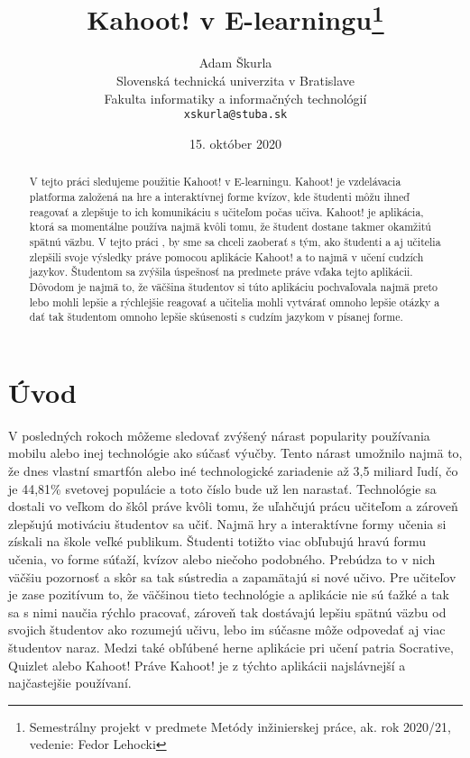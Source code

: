 \documentclass[10pt,oneside,slovak,a4paper]{article}
\title{Kahoot! v E-learningu\thanks{Semestrálny projekt v predmete Metódy inžinierskej práce, ak. rok 2020/21, vedenie: Fedor Lehocki}} %
\author{Adam Škurla\\[2pt]
	{\small Slovenská technická univerzita v Bratislave}\\
	{\small Fakulta informatiky a informačných technológií}\\
	{\small \texttt{xskurla@stuba.sk}}
	}
\date{\small 15. október 2020}
\begin{document}
\maketitle

\begin{abstract}
V tejto práci sledujeme použitie Kahoot! v E-learningu. Kahoot! je vzdelávacia platforma založená na hre a interaktívnej forme kvízov, kde študenti môžu ihneď reagovať a zlepšuje to ich komunikáciu s učiteľom počas učiva. Kahoot! je aplikácia, ktorá sa momentálne používa najmä kvôli tomu, že študent dostane takmer okamžitú spätnú väzbu. V tejto práci , by sme sa chceli zaoberať s tým, ako študenti a aj učitelia zlepšili svoje výsledky práve pomocou aplikácie Kahoot! a to najmä v učení cudzích jazykov. Študentom sa zvýšila úspešnosť na predmete práve vďaka tejto aplikácii. Dôvodom je najmä to, že väčšina študentov si túto aplikáciu pochvaľovala najmä preto lebo mohli lepšie a rýchlejšie reagovať a učitelia mohli vytvárať omnoho lepšie otázky a dať tak študentom omnoho lepšie skúsenosti s cudzím jazykom v písanej forme.
\end{abstract}



\section{Úvod}

V posledných rokoch môžeme sledovať zvýšený nárast popularity používania mobilu alebo inej technológie ako súčasť výučby. Tento nárast umožnilo najmä to, že dnes vlastní smartfón alebo iné technologické zariadenie až 3,5 miliard ľudí, čo je 44,81\% svetovej populácie a toto číslo bude už len narastať. Technológie sa dostali vo veľkom do škôl práve kvôli tomu, že uľahčujú prácu učiteľom a zároveň zlepšujú motiváciu študentov sa učiť. Najmä hry a interaktívne formy učenia si získali na škole veľké publikum. Študenti totižto viac obľubujú hravú formu učenia, vo forme súťaží, kvízov alebo niečoho podobného. Prebúdza to v nich väčšiu pozornosť a skôr sa tak sústredia a zapamätajú si nové učivo. Pre učiteľov je zase pozitívum to, že väčšinou tieto technológie a aplikácie nie sú ťažké a tak sa s nimi naučia rýchlo pracovať, zároveň tak dostávajú lepšiu spätnú väzbu od svojich študentov ako rozumejú učivu, lebo im súčasne môže odpovedať aj viac študentov naraz. Medzi také obľúbené herne aplikácie pri učení patria Socrative, Quizlet alebo Kahoot! Práve Kahoot! je z týchto aplikácii najslávnejší a najčastejšie používaní.  
	
\end{document}
